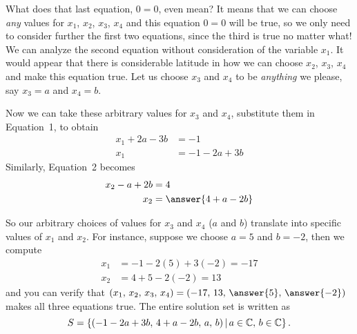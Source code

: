 \documentclass{ximera}
\begin{document}
\begin{example}
\begin{exercise}
    \begin{question}
      What does that last equation, $0=0$, even mean?  It means that we
      can choose \textit{any} values for $x_1$, $x_2$, $x_3$, $x_4$ and
      this equation $0=0$ will be true, so we only need to consider
      further the first two equations, since the third is true no matter
      what!  We can analyze the second equation without consideration of
      the variable $x_1$.  It would appear that there is considerable
      latitude in how we can choose $x_2$, $x_3$, $x_4$ and make this
      equation true.  Let us choose $x_3$ and $x_4$ to be
      \textit{anything} we please, say $x_3=a$ and $x_4=b$.
      
      Now we can take these arbitrary values for $x_3$ and $x_4$, substitute them in Equation~1, to obtain
      \begin{align*}
        x_1+2a - 3b&= -1\\
        x_1&=-1-2a+3b
      \end{align*}
      Similarly, Equation~2 becomes
      \begin{align*}
        x_2-a+2b&=4\\
        x_2&=\answer{4 +a -2 b}
      \end{align*}
      
      \begin{question}
        So our arbitrary choices of values for $x_3$ and $x_4$ ($a$ and
        $b$) translate into specific values of $x_1$ and $x_2$.  For
        instance, suppose we choose $a=5$ and $b=-2$, then we compute
        \begin{align*}
          x_1&=-1-2(5)+3(-2)=-17\\
          x_2&=4+5-2(-2)=13
        \end{align*}
        and you can verify that $(x_1,\,x_2,\,x_3,\,x_4)=(-17,\,13,\,\answer{5},\,\answer{-2})$ makes all three equations true.  The entire solution set is written as
        \[
          S=\left\lbrace(-1-2a+3b,\,4 +a-2b,\,a,\,b)\,\middle|\, a\in\mathbb{C},\,b\in\mathbb{C}\right\rbrace.
        \]
      \end{question}
      
    \end{question}
    
  \end{exercise}
  
\end{example}
\end{document}
